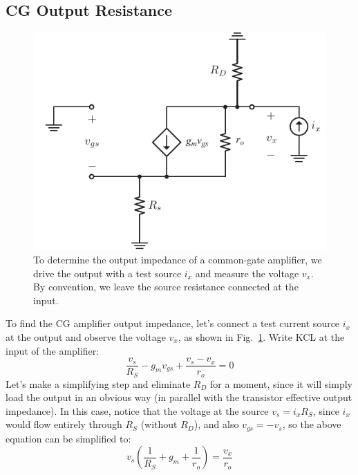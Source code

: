 \subsection{CG Output Resistance}
\begin{figure}[tb]
\centering
\includegraphics[scale=.9]{cgamp_is_ac_ss_rout}
\caption{To determine the output impedance of a common-gate amplifier, we drive the output with a test source $i_x$ and measure the voltage $v_x$.  By convention, we leave the source resistance connected at the input.}
\label{fig:cgamp_is_ac_ss_rout}
\end{figure}
To find the CG amplifier output impedance, let's connect a test current source $i_x$ at the output and observe the voltage $v_x$, as shown in Fig.~\ref{fig:cgamp_is_ac_ss_rout}.  Write KCL at the input of the amplifier:
    \begin{equation}
        \frac{{{v_s}}}{{{R_S}}} - {g_m}{v_{gs}} + \frac{{{v_s} - {v_x}}}{{{r_o}}} = 0
    \end{equation}
Let's make a simplifying step and eliminate $R_D$ for a moment, since it will simply load the output in an obvious way (in parallel with the transistor effective output impedance).  In this case, notice that the voltage at the source $v_s = i_x R_S$, since $i_x$ would flow entirely through $R_S$ (without $R_D$), and also $v_{gs} = -v_s$, so the above equation can be simplified to:
    \begin{equation}
        {v_s}\left( {\frac{1}{{{R_S}}} + {g_m} + \frac{1}{{{r_o}}}} \right) = \frac{{{v_x}}}{{{r_o}}}
    \end{equation}
